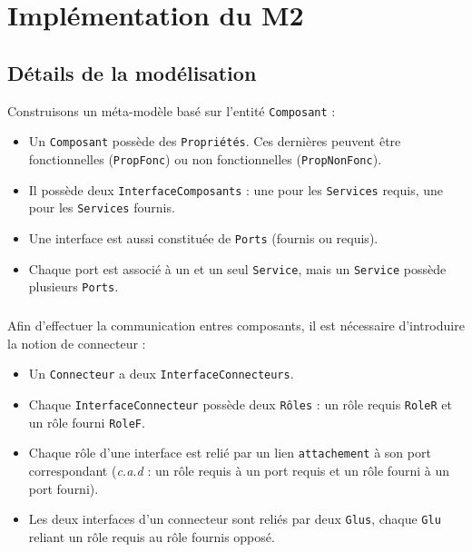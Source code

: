 \chapter{Implémentation du M2}\label{chap:M2}
\section{Détails de la modélisation}
Construisons un méta-modèle basé sur l'entité \verb+Composant+ :
\begin{itemize}
\item 
  Un \verb+Composant+ possède des \verb+Propriétés+. Ces dernières peuvent être fonctionnelles (\verb+PropFonc+) ou non fonctionnelles (\verb+PropNonFonc+).
\item 
  Il possède deux \verb+InterfaceComposants+ :  une pour les \verb+Services+ requis, une pour les \verb+Services+ fournis.
\item
  Une interface est aussi constituée de \verb+Ports+ (fournis ou requis). 
\item
  Chaque port est associé à un et un seul \verb+Service+, mais un \verb+Service+ possède plusieurs \verb+Ports+.  
\end{itemize}


\paragraph{}
Afin d'effectuer la communication entres composants, il est nécessaire d'introduire la notion de connecteur :

\begin{itemize}
\item 
  Un \verb+Connecteur+ a deux \verb+InterfaceConnecteurs+.
\item
  Chaque \verb+InterfaceConnecteur+ possède deux \verb+Rôles+ : un rôle requis \verb+RoleR+  et un rôle fourni \verb+RoleF+.
\item
  Chaque rôle d'une interface est relié par un lien \verb+attachement+  à son port correspondant (\textit{c.a.d }: un rôle requis à un port requis et un rôle fourni à un port fourni).  
\item
  Les deux interfaces d'un connecteur sont reliés par deux \verb+Glus+, chaque \verb+Glu+  reliant un rôle requis au rôle fournis opposé.
\end{itemize}

\paragraph{}

